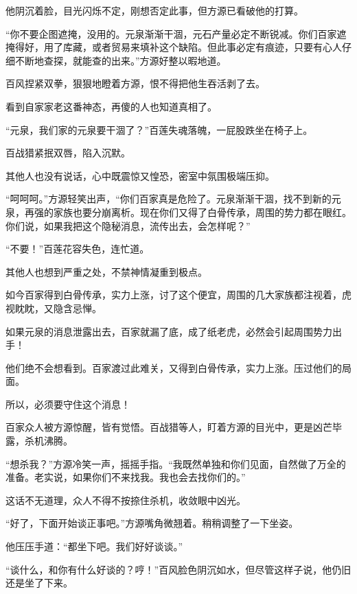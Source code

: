 
\begin{this_body}



他阴沉着脸，目光闪烁不定，刚想否定此事，但方源已看破他的打算。

“你不要企图遮掩，没用的。元泉渐渐干涸，元石产量必定不断锐减。你们百家遮掩得好，用了库藏，或者贸易来填补这个缺陷。但此事必定有痕迹，只要有心人仔细不断地查探，就能查的出来。”方源好整以暇地道。

百风捏紧双拳，狠狠地瞪着方源，恨不得把他生吞活剥了去。

看到自家家老这番神态，再傻的人也知道真相了。

“元泉，我们家的元泉要干涸了？”百莲失魂落魄，一屁股跌坐在椅子上。

百战猎紧抿双唇，陷入沉默。

其他人也没有说话，心中既震惊又惶恐，密室中氛围极端压抑。

“呵呵呵。”方源轻笑出声，“你们百家真是危险了。元泉渐渐干涸，找不到新的元泉，再强的家族也要分崩离析。现在你们又得了白骨传承，周围的势力都在眼红。你们说，如果我把这个隐秘消息，流传出去，会怎样呢？”

“不要！”百莲花容失色，连忙道。

其他人也想到严重之处，不禁神情凝重到极点。

如今百家得到白骨传承，实力上涨，讨了这个便宜，周围的几大家族都注视着，虎视眈眈，又隐含忌惮。

如果元泉的消息泄露出去，百家就漏了底，成了纸老虎，必然会引起周围势力出手！

他们绝不会想看到。百家渡过此难关，又得到白骨传承，实力上涨。压过他们的局面。

所以，必须要守住这个消息！

百家众人被方源惊醒，皆有觉悟。百战猎等人，盯着方源的目光中，更是凶芒毕露，杀机沸腾。

“想杀我？”方源冷笑一声，摇摇手指。“我既然单独和你们见面，自然做了万全的准备。老实说，如果你们不来找我。我也会去找你们的。”

这话不无道理，众人不得不按捺住杀机，收敛眼中凶光。

“好了，下面开始谈正事吧。”方源嘴角微翘着。稍稍调整了一下坐姿。

他压压手道：“都坐下吧。我们好好谈谈。”

“谈什么，和你有什么好谈的？哼！”百风脸色阴沉如水，但尽管这样子说，他仍旧还是坐了下来。


\end{this_body}

